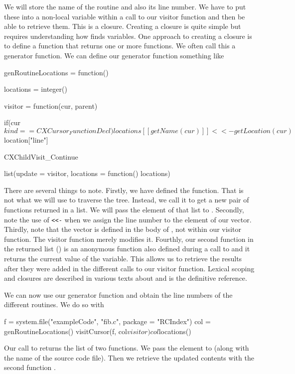 We will store the name of the routine and also its line number.
We have to put these into a non-local variable within a call to our
visitor  function and then be able to retrieve them. This is a closure.
Creating a closure is quite simple but requires understanding how \R{}
finds variables.  One approach to creating a closure is to define a
function that returns one or more functions.  We often call this a
generator function.
We can define our generator function something like
\begin{RCode}
genRoutineLocations = 
function() 
{
   locations = integer()

    visitor = function(cur, parent) {
       if(cur$kind == CXCursor_FunctionDecl) 
         locations[[ getName(cur) ]] <<- getLocation(cur)$location["line"]

        CXChildVisit_Continue
    }

    list(update = visitor, locations = function() locations)
}
\end{RCode}
There are several things to note.  Firstly, we have defined the
 function. That is not what we will use to
traverse the tree. Instead, we call it to get a new pair of functions
returned in a list.  We will pass the  element of that
list to .  Secondly, note the use of \verb+<<-+
when we assign the line number to the element of our 
vector.  Thirdly, note that the  vector is defined in
the body of , not within our visitor
function. The visitor function merely modifies it.  Fourthly, our
second function in the returned list () is an anonymous
function also defined during a call to  and
it returns the current value of the  variable.  This
allows us to retrieve the results after they were added in the
different calls to our visitor function.  Lexical scoping and closures
are described in various texts about \R and \cite{bib:LexicalScoping}
is the definitive reference.

We can now use our generator function and obtain the line numbers of
the different routines. We do so with
\begin{RCode}
f = system.file("exampleCode", "fib.c", package = "RCIndex")
col = genRoutineLocations()
visitCursor(f, col$visitor)
col$locations()
\end{RCode}
Our call to  returns the list of two
functions.
We pass the  element  to  (along with
the name of the source code file).
Then we retrieve the updated contents with the second function .


